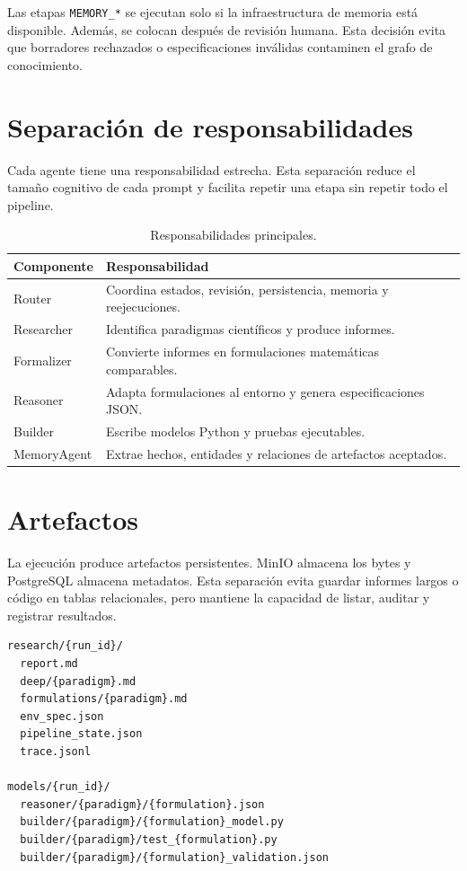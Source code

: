 Las etapas \texttt{MEMORY\_*} se ejecutan solo si la infraestructura de memoria
está disponible. Además, se colocan después de revisión humana. Esta decisión
evita que borradores rechazados o especificaciones inválidas contaminen el grafo
de conocimiento.

\section{Separación de responsabilidades}

Cada agente tiene una responsabilidad estrecha. Esta separación reduce el tamaño
cognitivo de cada prompt y facilita repetir una etapa sin repetir todo el
pipeline.

\begin{table}[H]
\begin{center}
\begin{tabular}{|l|p{9cm}|} \hline
\textbf{Componente} & \textbf{Responsabilidad} \\ \hline
Router & Coordina estados, revisión, persistencia, memoria y reejecuciones. \\ \hline
Researcher & Identifica paradigmas científicos y produce informes. \\ \hline
Formalizer & Convierte informes en formulaciones matemáticas comparables. \\ \hline
Reasoner & Adapta formulaciones al entorno y genera especificaciones JSON. \\ \hline
Builder & Escribe modelos Python y pruebas ejecutables. \\ \hline
MemoryAgent & Extrae hechos, entidades y relaciones de artefactos aceptados. \\ \hline
\end{tabular}
\caption{Responsabilidades principales.}
\end{center}
\end{table}

\section{Artefactos}

La ejecución produce artefactos persistentes. MinIO almacena los bytes y
PostgreSQL almacena metadatos. Esta separación evita guardar informes largos o
código en tablas relacionales, pero mantiene la capacidad de listar, auditar y
registrar resultados.

\begin{verbatim}
research/{run_id}/
  report.md
  deep/{paradigm}.md
  formulations/{paradigm}.md
  env_spec.json
  pipeline_state.json
  trace.jsonl

models/{run_id}/
  reasoner/{paradigm}/{formulation}.json
  builder/{paradigm}/{formulation}_model.py
  builder/{paradigm}/test_{formulation}.py
  builder/{paradigm}/{formulation}_validation.json
\end{verbatim}


